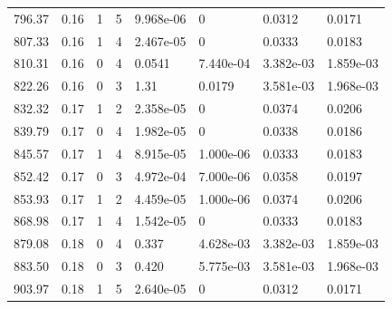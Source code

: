 \documentclass[preview]{standalone}
\begin{document}
{{{\begin{tabular}{L{1.2cm}C{1.2cm} C{0.3cm}C{0.5cm} C{1.4cm}C{1.4cm} C{1.4cm}C{1.4cm}}
  796.37  &  0.16  & 1     &  5 &  9.968e-06  & 0  & 0.0312 &  0.0171   \\ 
  807.33  &  0.16  & 1     &  4 &  2.467e-05  & 0  & 0.0333 &  0.0183   \\ 
  810.31  &  0.16  & 0     &  4 &  0.0541  & 7.440e-04  & 3.382e-03 &  1.859e-03   \\ 
  822.26  &  0.16  & 0     &  3 &  1.31  & 0.0179  & 3.581e-03 &  1.968e-03   \\ 
  832.32  &  0.17  & 1     &  2 &  2.358e-05  & 0  & 0.0374 &  0.0206   \\ 
  839.79  &  0.17  & 0     &  4 &  1.982e-05  & 0  & 0.0338 &  0.0186   \\ 
  845.57  &  0.17  & 1     &  4 &  8.915e-05  & 1.000e-06  & 0.0333 &  0.0183   \\ 
  852.42  &  0.17  & 0     &  3 &  4.972e-04  & 7.000e-06  & 0.0358 &  0.0197   \\ 
  853.93  &  0.17  & 1     &  2 &  4.459e-05  & 1.000e-06  & 0.0374 &  0.0206   \\ 
  868.98  &  0.17  & 1     &  4 &  1.542e-05  & 0  & 0.0333 &  0.0183   \\ 
  879.08  &  0.18  & 0     &  4 &  0.337  & 4.628e-03  & 3.382e-03 &  1.859e-03   \\ 
  883.50  &  0.18  & 0     &  3 &  0.420  & 5.775e-03  & 3.581e-03 &  1.968e-03   \\ 
  903.97  &  0.18  & 1     &  5 &  2.640e-05  & 0  & 0.0312 &  0.0171   \\ 
\hline 
\end{tabular} 

}}}
\end{document}
